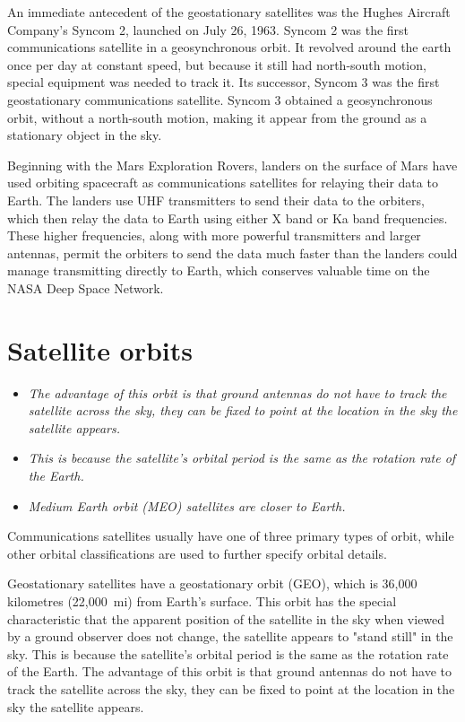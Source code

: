 An immediate antecedent of the geostationary satellites was the Hughes
Aircraft Company's Syncom 2, launched on July 26, 1963. Syncom 2 was the
first communications satellite in a geosynchronous orbit. It revolved
around the earth once per day at constant speed, but because it still
had north-south motion, special equipment was needed to track it. Its
successor, Syncom 3 was the first geostationary communications
satellite. Syncom 3 obtained a geosynchronous orbit, without a
north-south motion, making it appear from the ground as a stationary
object in the sky.

Beginning with the Mars Exploration Rovers, landers on the surface of
Mars have used orbiting spacecraft as communications satellites for
relaying their data to Earth. The landers use UHF transmitters to send
their data to the orbiters, which then relay the data to Earth using
either X band or Ka band frequencies. These higher frequencies, along
with more powerful transmitters and larger antennas, permit the orbiters
to send the data much faster than the landers could manage transmitting
directly to Earth, which conserves valuable time on the NASA Deep Space
Network.

\section{Satellite orbits}\label{satellite-orbits}

\begin{itemize}
\item
  \emph{The advantage of this orbit is that ground antennas do not have
  to track the satellite across the sky, they can be fixed to point at
  the location in the sky the satellite appears.}
\item
  \emph{This is because the satellite's orbital period is the same as
  the rotation rate of the Earth.}
\item
  \emph{Medium Earth orbit (MEO) satellites are closer to Earth.}
\end{itemize}

Communications satellites usually have one of three primary types of
orbit, while other orbital classifications are used to further specify
orbital details.

Geostationary satellites have a geostationary orbit (GEO), which is
36,000 kilometres (22,000~mi) from Earth's surface. This orbit has the
special characteristic that the apparent position of the satellite in
the sky when viewed by a ground observer does not change, the satellite
appears to "stand still" in the sky. This is because the satellite's
orbital period is the same as the rotation rate of the Earth. The
advantage of this orbit is that ground antennas do not have to track the
satellite across the sky, they can be fixed to point at the location in
the sky the satellite appears.

